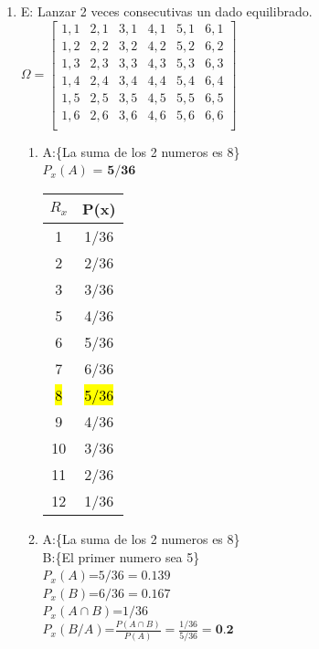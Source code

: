 \documentclass[12pt,letterpaper]{article}
\begin{document}
\begin{enumerate}
    \item
        E: Lanzar 2 veces consecutivas un dado equilibrado.\\
        $
        \Omega =
        \begin{bmatrix}
            1,1&2,1&3,1&4,1&5,1&6,1 \\
            1,2&2,2&3,2&4,2&5,2&6,2 \\
            1,3&2,3&3,3&4,3&5,3&6,3 \\
            1,4&2,4&3,4&4,4&5,4&6,4 \\
            1,5&2,5&3,5&4,5&5,5&6,5 \\
            1,6&2,6&3,6&4,6&5,6&6,6 \\
        \end{bmatrix}
        $
        \begin{enumerate}
            \item
                A:\{La suma de los 2 numeros es 8\}\\
                $P_{x}(A)$ = $\textbf{5/36}$\\
                \begin{tabular}{||c c||}
                     \hline
                     $R_{x}$ & P(x) \\ [0.5ex]
                     \hline\hline
                     1 & 1/36 \\
                     2 & 2/36  \\
                     3 & 3/36  \\
                     5 & 4/36  \\
                     6 & 5/36  \\
                     7 & 6/36  \\
                     \hl{8} & \hl{5/36}  \\
                     9 & 4/36  \\
                     10 & 3/36  \\
                     11 & 2/36  \\
                     12 & 1/36  \\
                     \hline
                 \end{tabular}
            \item
                A:\{La suma de los 2 numeros es 8\}\\
                B:\{El primer numero sea 5\}\\
                $P_{x}(A)$=$ 5/36 = 0.139$\\
                $P_{x}(B)$=$ 6/36 = 0.167$\\
                $P_{x}(A \cap B)$=$ 1/36$\\
                $P_{x}(B/A)$=$ \frac{P(A\cap B)}{P(A)}=\frac{1/36}{5/36}=\textbf{0.2}$
        \end{enumerate}


\end{enumerate}
\end{document}
